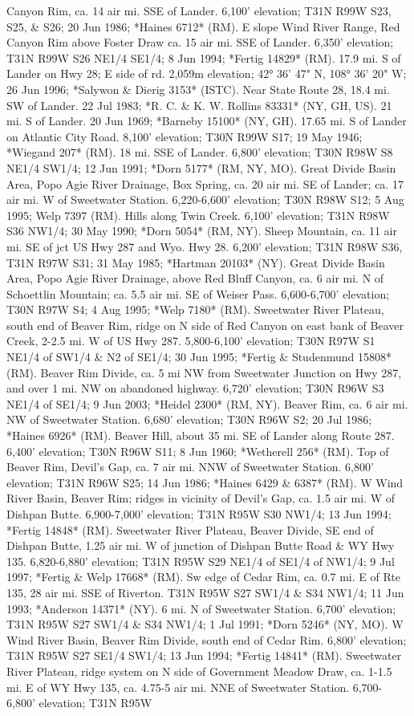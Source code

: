 Canyon Rim, ca. 14 air mi. SSE of Lander. 6,100' elevation; T31N R99W S23, S25, \& S26; 20 Jun 1986; *Haines 6712* (RM).  E slope Wind River Range, Red Canyon Rim above Foster Draw ca. 15 air mi. SSE of Lander.  6,350' elevation; T31N R99W S26 NE1/4 SE1/4; 8 Jun 1994; *Fertig 14829* (RM).  17.9 mi. S of Lander on Hwy 28; E side of rd. 2,059m elevation; 42° 36' 47" N, 108° 36' 20" W; 26 Jun 1996; *Salywon \& Dierig 3153* (ISTC).  Near State Route 28, 18.4 mi. SW of Lander. 22 Jul 1983; *R. C. \& K. W. Rollins 83331* (NY, GH, US).  21 mi. S of Lander. 20 Jun 1969; *Barneby 15100* (NY, GH).  17.65 mi. S of Lander on Atlantic City Road. 8,100' elevation; T30N R99W S17; 19 May 1946; *Wiegand 207* (RM).  18 mi. SSE of Lander. 6,800' elevation; T30N R98W S8 NE1/4 SW1/4; 12 Jun 1991; *Dorn 5177* (RM, NY, MO).  Great Divide Basin Area, Popo Agie River Drainage, Box Spring, ca. 20 air mi. SE of Lander; ca. 17 air mi. W of Sweetwater Station. 6,220-6,600' elevation; T30N R98W S12; 5 Aug 1995; Welp 7397 (RM).  Hills along Twin Creek. 6,100' elevation; T31N R98W S36 NW1/4; 30 May 1990; *Dorn 5054* (RM, NY).  Sheep Mountain, ca. 11 air mi. SE of jct US Hwy 287 and Wyo. Hwy 28. 6,200' elevation; T31N R98W S36, T31N R97W S31; 31 May 1985; *Hartman 20103* (NY).  Great Divide Basin Area, Popo Agie River Drainage, above Red Bluff Canyon, ca. 6 air mi. N of Schoettlin Mountain; ca. 5.5 air mi. SE of Weiser Pass. 6,600-6,700' elevation; T30N R97W S4; 4 Aug 1995; *Welp 7180* (RM).  Sweetwater River Plateau, south end of Beaver Rim, ridge on N side of Red Canyon on east bank of Beaver Creek, 2-2.5 mi. W of US Hwy 287. 5,800-6,100' elevation; T30N R97W S1 NE1/4 of SW1/4 \& N2 of SE1/4; 30 Jun 1995; *Fertig \& Studenmund 15808* (RM).  Beaver Rim Divide, ca. 5 mi NW from Sweetwater Junction on Hwy 287, and over 1 mi. NW on abandoned highway. 6,720' elevation; T30N R96W S3 NE1/4 of SE1/4; 9 Jun 2003; *Heidel 2300* (RM, NY).  Beaver Rim, ca. 6 air mi. NW of Sweetwater Station. 6,680' elevation; T30N R96W S2; 20 Jul 1986; *Haines 6926* (RM).  Beaver Hill, about 35 mi. SE of Lander along Route 287. 6,400' elevation; T30N R96W S11; 8 Jun 1960; *Wetherell 256* (RM).  Top of Beaver Rim, Devil's Gap, ca. 7 air mi. NNW of Sweetwater Station. 6,800' elevation; T31N R96W S25; 14 Jun 1986; *Haines 6429 \& 6387* (RM).  W Wind River Basin, Beaver Rim; ridges in vicinity of Devil's Gap, ca. 1.5 air mi. W of Dishpan Butte. 6,900-7,000' elevation; T31N R95W S30 NW1/4; 13 Jun 1994; *Fertig 14848* (RM).  Sweetwater River Plateau, Beaver Divide, SE end of Dishpan Butte, 1.25 air mi. W of junction of Dishpan Butte Road \& WY Hwy 135. 6,820-6,880' elevation; T31N R95W S29 NE1/4 of SE1/4 of NW1/4; 9 Jul 1997; *Fertig \& Welp 17668* (RM).  Sw edge of Cedar Rim, ca. 0.7 mi. E of Rte 135, 28 air mi. SSE of Riverton.  T31N R95W S27 SW1/4 \& S34 NW1/4; 11 Jun 1993; *Anderson 14371* (NY).  6 mi. N of Sweetwater Station. 6,700' elevation; T31N R95W S27 SW1/4 \& S34 NW1/4; 1 Jul 1991; *Dorn 5246* (NY, MO).  W Wind River Basin, Beaver Rim Divide, south end of Cedar Rim. 6,800' elevation; T31N R95W S27 SE1/4 SW1/4; 13 Jun 1994; *Fertig 14841* (RM).  Sweetwater River Plateau, ridge system on N side of Government Meadow Draw, ca. 1-1.5 mi. E of WY Hwy 135, ca. 4.75-5 air mi. NNE of Sweetwater Station. 6,700-6,800' elevation; T31N R95W 